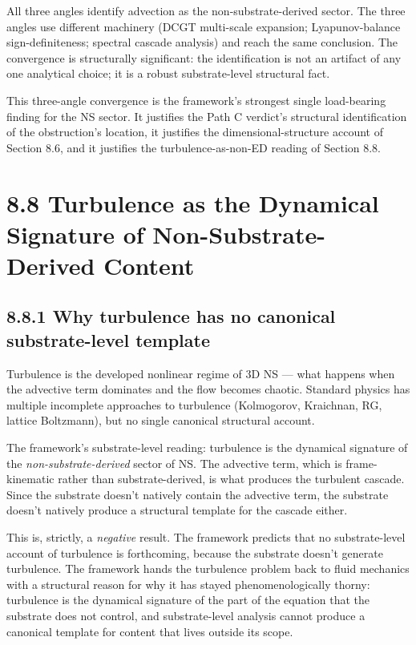 \documentclass[11pt]{book}
\begin{document}
All three angles identify advection as the non-substrate-derived sector. The three angles use different machinery (DCGT multi-scale expansion; Lyapunov-balance sign-definiteness; spectral cascade analysis) and reach the same conclusion. The convergence is structurally significant: the identification is not an artifact of any one analytical choice; it is a robust substrate-level structural fact.

This three-angle convergence is the framework's strongest single load-bearing finding for the NS sector. It justifies the Path C verdict's structural identification of the obstruction's location, it justifies the dimensional-structure account of Section 8.6, and it justifies the turbulence-as-non-ED reading of Section 8.8.

\section{8.8 Turbulence as the Dynamical Signature of Non-Substrate-Derived Content}

\subsection{8.8.1 Why turbulence has no canonical substrate-level template}

Turbulence is the developed nonlinear regime of 3D NS — what happens when the advective term dominates and the flow becomes chaotic. Standard physics has multiple incomplete approaches to turbulence (Kolmogorov, Kraichnan, RG, lattice Boltzmann), but no single canonical structural account.

The framework's substrate-level reading: turbulence is the dynamical signature of the \textit{non-substrate-derived} sector of NS. The advective term, which is frame-kinematic rather than substrate-derived, is what produces the turbulent cascade. Since the substrate doesn't natively contain the advective term, the substrate doesn't natively produce a structural template for the cascade either.

This is, strictly, a \textit{negative} result. The framework predicts that no substrate-level account of turbulence is forthcoming, because the substrate doesn't generate turbulence. The framework hands the turbulence problem back to fluid mechanics with a structural reason for why it has stayed phenomenologically thorny: turbulence is the dynamical signature of the part of the equation that the substrate does not control, and substrate-level analysis cannot produce a canonical template for content that lives outside its scope.
\end{document}
